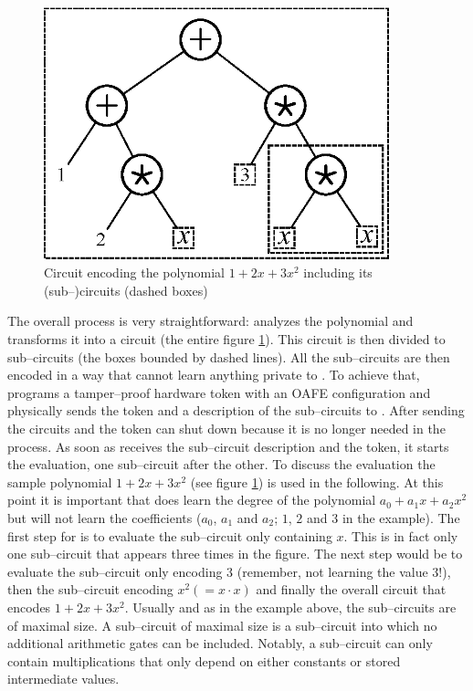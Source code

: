 \begin{figure}[htb]
  \centering
  \includegraphics[width=10cm]{images/sample-polynomial.eps}
  \caption{Circuit encoding the polynomial $1 + 2x + 3x^2$ including its
    (sub--)circuits (dashed boxes)}
  \label{fig:sample-poly}
\end{figure}

The overall process is very straightforward: \JWpOne{} analyzes the polynomial
and transforms it into a circuit (the entire figure \ref{fig:sample-poly}). This
circuit is then divided to sub--circuits (the boxes bounded by dashed lines).
All the sub--circuits are then encoded in a way that \JWpTwo{} cannot learn
anything private to \JWpOne{}. To achieve that, \JWpOne{} programs a
tamper--proof hardware token with an OAFE configuration and physically sends the
token and a description of the sub--circuits to \JWpTwo{}.  After sending the
circuits and the token \JWpOne{} can shut down because it is no longer needed in
the process. As soon as \JWpTwo{} receives the sub--circuit description and the
token, it starts the evaluation, one sub--circuit after the other. To discuss
the evaluation the sample polynomial $1 + 2x + 3x^2$ (see figure
\ref{fig:sample-poly}) is used in the following. At this point it is important
that \JWpTwo{} does learn the degree of the polynomial $a_0 + a_1x + a_2x^2$ but
will not learn the coefficients ($a_0$, $a_1$ and $a_2$; $1$, $2$ and $3$ in the
example). The first step for \JWpTwo{} is to evaluate the sub--circuit only
containing $x$.  This is in fact only one sub--circuit that appears three times
in the figure.  The next step would be to evaluate the sub--circuit only
encoding $3$ (remember, not learning the value $3$!), then the sub--circuit
encoding $x^2 (= x \cdot x)$ and finally the overall circuit that encodes $1 +
2x + 3x^2$.  Usually and as in the example above, the sub--circuits are of
maximal size. A sub--circuit of maximal size is a sub--circuit into which no
additional arithmetic gates can be included. Notably, a sub--circuit can only
contain multiplications that only depend on either constants or stored
intermediate values.

